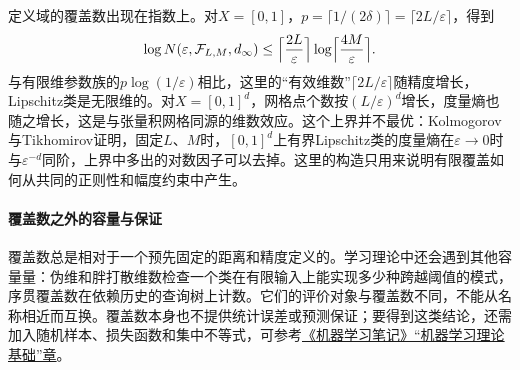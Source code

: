 定义域的覆盖数出现在指数上。对$X=[0,1]$，$p=\lceil1/(2\delta)\rceil=\lceil2L/\varepsilon\rceil$，得到
\[
  \log N(\varepsilon,\mathcal F_{L,M},d_\infty)\le\Bigl\lceil\frac{2L}\varepsilon\Bigr\rceil\log\Bigl\lceil\frac{4M}\varepsilon\Bigr\rceil .
\]
与有限维参数族的$p\log(1/\varepsilon)$相比，这里的“有效维数”$\lceil2L/\varepsilon\rceil$随精度增长，Lipschitz类是无限维的。对$X=[0,1]^d$，网格点个数按$(L/\varepsilon)^d$增长，度量熵也随之增长，这是与张量积网格同源的维数效应。这个上界并不最优：Kolmogorov与Tikhomirov证明，固定$L$、$M$时，$[0,1]^d$上有界Lipschitz类的度量熵在$\varepsilon\to0$时与$\varepsilon^{-d}$同阶，上界中多出的对数因子可以去掉。这里的构造只用来说明有限覆盖如何从共同的正则性和幅度约束中产生。

\paragraph{覆盖数之外的容量与保证}

覆盖数总是相对于一个预先固定的距离和精度定义的。学习理论中还会遇到其他容量量：伪维和胖打散维数检查一个类在有限输入上能实现多少种跨越阈值的模式，序贯覆盖数在依赖历史的查询树上计数。它们的评价对象与覆盖数不同，不能从名称相近而互换。覆盖数本身也不提供统计误差或预测保证；要得到这类结论，还需加入随机样本、损失函数和集中不等式，可参考\href{https://github.com/shixiaogang/notes-on-machine-learning/blob/ff88d50e0edf94a815bc6e16e76ded414f406dc2/tex/06-foundations/02-learning-theory/01-statistical-learning-framework.tex}{《机器学习笔记》“机器学习理论基础”章}。
